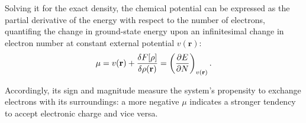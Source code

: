 
Solving it for the exact density, the chemical potential can be expressed as
the partial derivative of the energy with respect to the number of electrons,
quantifing the change in ground-state energy upon an infinitesimal change in
electron number at constant external potential $v(\mathbf{r})$:
%
\begin{align}
  \mu = v(\mathbf{r}) + \fdv{F[\rho]}{\rho(\mathbf{r})}
  = \left(\pdv{E}{N}\right)_{v(\mathbf{r})}.
\end{align}


Accordingly, its sign and magnitude measure the system's propensity to exchange
electrons with its surroundings: a more negative $\mu$ indicates a stronger
tendency to accept electronic charge and vice versa.


